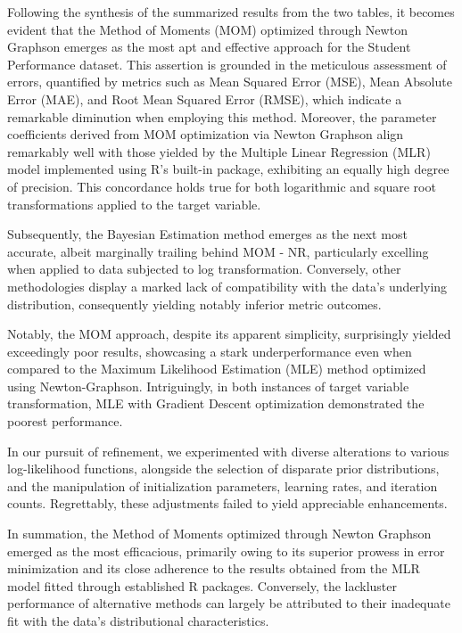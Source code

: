 \documentclass[12pt]{article}
\begin{document}
	Following the synthesis of the summarized results from the two tables, it becomes evident that the Method of Moments (MOM) optimized through Newton Graphson emerges as the most apt and effective approach for the Student Performance dataset. This assertion is grounded in the meticulous assessment of errors, quantified by metrics such as Mean Squared Error (MSE), Mean Absolute Error (MAE), and Root Mean Squared Error (RMSE), which indicate a remarkable diminution when employing this method. Moreover, the parameter coefficients derived from MOM optimization via Newton Graphson align remarkably well with those yielded by the Multiple Linear Regression (MLR) model implemented using R's built-in package, exhibiting an equally high degree of precision. This concordance holds true for both logarithmic and square root transformations applied to the target variable.
	
	Subsequently, the Bayesian Estimation method emerges as the next most accurate, albeit marginally trailing behind MOM - NR, particularly excelling when applied to data subjected to log transformation. Conversely, other methodologies display a marked lack of compatibility with the data's underlying distribution, consequently yielding notably inferior metric outcomes.
	
	Notably, the MOM approach, despite its apparent simplicity, surprisingly yielded exceedingly poor results, showcasing a stark underperformance even when compared to the Maximum Likelihood Estimation (MLE) method optimized using Newton-Graphson. Intriguingly, in both instances of target variable transformation, MLE with Gradient Descent optimization demonstrated the poorest performance.
	
	In our pursuit of refinement, we experimented with diverse alterations to various log-likelihood functions, alongside the selection of disparate prior distributions, and the manipulation of initialization parameters, learning rates, and iteration counts. Regrettably, these adjustments failed to yield appreciable enhancements.
	
	In summation, the Method of Moments optimized through Newton Graphson emerged as the most efficacious, primarily owing to its superior prowess in error minimization and its close adherence to the results obtained from the MLR model fitted through established R packages. Conversely, the lackluster performance of alternative methods can largely be attributed to their inadequate fit with the data's distributional characteristics.
	
\end{document}

